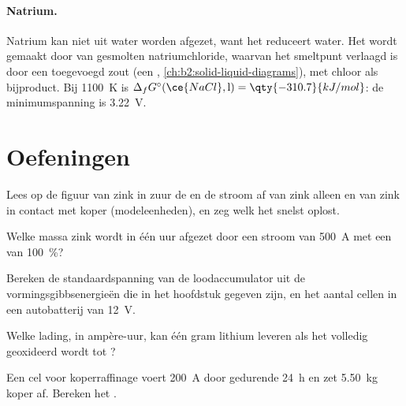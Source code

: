 \paragraph{Natrium.} Natrium kan niet uit water worden afgezet, want het reduceert water.
Het wordt gemaakt door  van gesmolten natriumchloride, waarvan het smeltpunt
verlaagd is door een toegevoegd zout (een , \cref{ch:b2:solid-liquid-diagrams}),
met chloor als bijproduct. Bij \qty{1100}{K} is $\Delta_f G^\circ(\ce{NaCl}, \text{l}) =
\qty{-310.7}{kJ/mol}$: de minimumspanning is \qty{3.22}{V}.

\section{Oefeningen}

\begin{exercise}[$\star$]\label{exo:b2:batteries-electrolysis:1}
Lees op de figuur van zink in zuur de  en de stroom af van zink
alleen en van zink in contact met koper (modeleenheden), en zeg welk het snelst
oplost.
\end{exercise}

\begin{exercise}[$\star$]\label{exo:b2:batteries-electrolysis:2}
Welke massa zink wordt in één uur afgezet door een stroom van \qty{500}{A} met een
 van 100~\%?
\end{exercise}

\begin{exercise}[$\star$]\label{exo:b2:batteries-electrolysis:3}
Bereken de standaardspanning van de loodaccumulator uit de
vormingsgibbsenergieën die in het hoofdstuk gegeven zijn, en het aantal cellen in een
autobatterij van \qty{12}{V}.
\end{exercise}

\begin{exercise}[$\star$]\label{exo:b2:batteries-electrolysis:4}
Welke lading, in ampère-uur, kan één gram lithium leveren als het volledig
geoxideerd wordt tot ?
\end{exercise}

\begin{exercise}[$\star\star$]\label{exo:b2:batteries-electrolysis:5}
Een cel voor koperraffinage voert \qty{200}{A} door gedurende \qty{24}{h} en zet
\qty{5.50}{kg} koper af. Bereken het .
\end{exercise}

